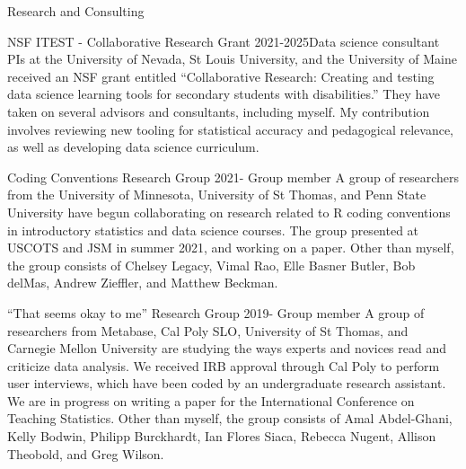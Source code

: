\documentclass{resume} %
\begin{document}
\begin{rSection}{Research and Consulting}

\begin{pSubsection}{NSF ITEST - Collaborative Research Grant}{ }{2021-2025}{Data science consultant}
{PIs at the University of Nevada, St Louis University, and the University of Maine received an NSF grant entitled ``Collaborative Research: Creating and testing data science learning tools for secondary students with disabilities.'' They have taken on several advisors and consultants, including myself. My contribution involves reviewing new tooling for statistical accuracy and pedagogical relevance, as well as developing data science curriculum.}
\end{pSubsection}

\begin{pSubsection}{Coding Conventions Research Group}{ }{2021- }{Group member}
{A group of researchers from the University of Minnesota, University of St Thomas, and Penn State University have begun collaborating on research related to R coding conventions in introductory statistics and data science courses. The group presented at USCOTS and JSM in summer 2021, and working on a paper. Other than myself, the group consists of Chelsey Legacy, Vimal Rao, Elle Basner Butler, Bob delMas, Andrew Zieffler, and Matthew Beckman.}
\end{pSubsection}


\begin{pSubsection}{``That seems okay to me'' Research Group}{ }{2019- }{Group member}
{A group of researchers from Metabase, Cal Poly SLO, University of St Thomas, and Carnegie Mellon University are studying the ways experts and novices read and criticize data analysis. We received IRB approval through Cal Poly to perform user interviews, which have been coded by an undergraduate research assistant. We are in progress on writing a paper for the International Conference on Teaching Statistics. Other than myself, the group consists of  Amal Abdel-Ghani, Kelly Bodwin, Philipp Burckhardt, Ian Flores Siaca, Rebecca Nugent, Allison Theobold, and Greg Wilson.}
\end{pSubsection}


\end{rSection}
\end{document}
